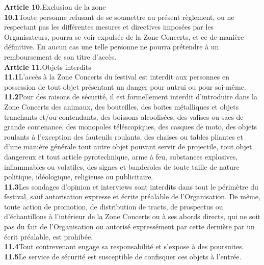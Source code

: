\documentclass[hidelinks, paper=a4, fontsize=13pt]{report}
\begin{document}
\textbf{Article 10.}\hspace{3mm}Exclusion de la zone\\
\textbf{10.1}\hspace{3mm}Toute personne refusant de se soumettre au présent règlement, ou ne respectant pas les différentes mesures et directives imposées par les Organisateurs, pourra se voir expulsée de la Zone Concerts, et ce de manière définitive. En aucun cas une telle personne ne pourra prétendre à un remboursement de son titre d’accès. \\


\textbf{Article 11.}\hspace{3mm}Objets interdits\\
\textbf{11.1}\hspace{3mm}L’accès à la Zone Concerts du festival est interdit aux personnes en possession de tout objet présentant un danger pour autrui ou pour soi-même.\\
\textbf{11.2}\hspace{3mm}Pour des raisons de sécurité, il est formellement interdit d'introduire dans la Zone Concerts des animaux, des bouteilles, des boites métalliques et objets tranchants et/ou contendants, des boissons alcoolisées, des valises ou sacs de grande contenance, des monopoles téléscopiques, des casques de moto, des objets roulants à l'exception des fauteuils roulants, des chaises ou tables pliantes et d'une manière générale tout autre objet pouvant servir de projectile, tout objet dangereux et tout article pyrotechnique, arme à feu, substances explosives, inflammables ou volatiles, des signes et banderoles de toute taille de nature politique, idéologique, religieuse ou publicitaire.\\
\textbf{11.3}\hspace{3mm}Les sondages d'opinion et interviews sont interdits dans tout le périmètre du festival, sauf autorisation expresse et écrite préalable de l'Organisation. De même, toute action de promotion, de distribution de tracts, de prospectus ou d'échantillons à l'intérieur de la Zone Concerts ou à ses abords directs, qui ne soit pas du fait de l'Organisation ou autorisé expressément par cette dernière par un écrit préalable, est prohibée.\\
\textbf{11.4}\hspace{3mm}Tout contrevenant engage sa responsabilité et s'expose à des poursuites.\\
\textbf{11.5}\hspace{3mm}Le service de sécurité est susceptible de confisquer ces objets à l’entrée.\\
\end{document}
